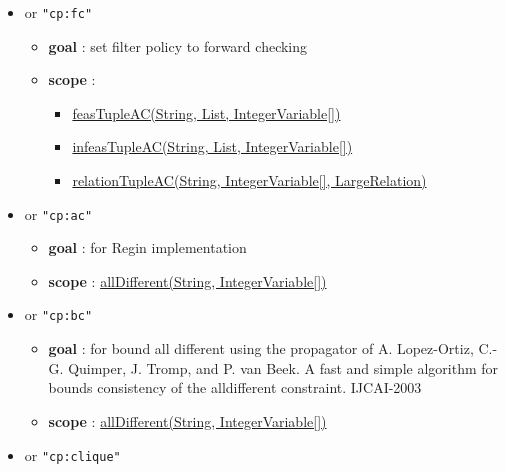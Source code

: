 \begin{itemize}
\begin{itemize}
		\end{itemize}
		\item \label{cextfc:cextfcoptions}\hypertarget{cextfc:cextfcoptions}{}					
		 or \texttt{"cp:fc"}
		\begin{itemize}
				\item \textbf{goal} : set filter policy to forward checking
				\item \textbf{scope} : 
					\begin{itemize}
						\item \hyperlink{feastupleac:feastupleacconstraint}{feasTupleAC(String, List, IntegerVariable[])}
						\item \hyperlink{infeastupleac:infeastupleacconstraint}{infeasTupleAC(String, List, IntegerVariable[])}
						\item \hyperlink{relationtupleac:relationtupleacconstraint}{relationTupleAC(String, IntegerVariable[], LargeRelation)}
					\end{itemize}	
		\end{itemize}
		\item \label{calldiffac:calldiffacoptions}\hypertarget{calldiffac:calldiffacoptions}{}
		 or \texttt{"cp:ac"}
		\begin{itemize}
				\item \textbf{goal} : for Regin implementation
				\item \textbf{scope} : \hyperlink{alldifferent:alldifferentconstraint}{allDifferent(String, IntegerVariable[])}
		\end{itemize}
		\item \label{calldiffbc:calldiffbcoptions}\hypertarget{calldiffbc:calldiffbcoptions}{}
		 or \texttt{"cp:bc"}
		\begin{itemize}
				\item \textbf{goal} : for bound all different using the propagator of A. Lopez-Ortiz, C.-G. Quimper, J. Tromp, and P. van Beek. A fast and simple algorithm for bounds consistency of the alldifferent constraint. IJCAI-2003
				\item \textbf{scope} : \hyperlink{alldifferent:alldifferentconstraint}{allDifferent(String, IntegerVariable[])}
		\end{itemize}
		\item \label{calldiffclique:calldiffcliqueoptions}\hypertarget{calldiffclique:calldiffcliqueoptions}{}
		 or \texttt{"cp:clique"}
		\begin{itemize}

\end{itemize}
\end{itemize}

